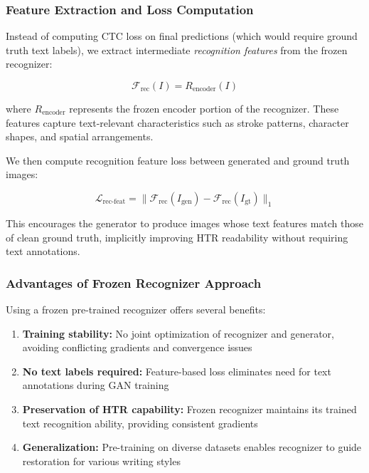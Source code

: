 \documentclass[journal]{IEEEtran}
\begin{document}
\subsubsection{Feature Extraction and Loss Computation}

Instead of computing CTC loss on final predictions (which would require ground truth text labels), we extract intermediate \textit{recognition features} from the frozen recognizer:

\begin{equation}
\mathcal{F}_{\text{rec}}(I) = R_{\text{encoder}}(I)
\end{equation}

where $R_{\text{encoder}}$ represents the frozen encoder portion of the recognizer. These features capture text-relevant characteristics such as stroke patterns, character shapes, and spatial arrangements.

We then compute recognition feature loss between generated and ground truth images:

\begin{equation}
\mathcal{L}_{\text{rec-feat}} = \|\mathcal{F}_{\text{rec}}(I_{\text{gen}}) - \mathcal{F}_{\text{rec}}(I_{\text{gt}})\|_1
\end{equation}

This encourages the generator to produce images whose text features match those of clean ground truth, implicitly improving HTR readability without requiring text annotations.

\subsubsection{Advantages of Frozen Recognizer Approach}

Using a frozen pre-trained recognizer offers several benefits:

\begin{enumerate}
    \item \textbf{Training stability:} No joint optimization of recognizer and generator, avoiding conflicting gradients and convergence issues
    \item \textbf{No text labels required:} Feature-based loss eliminates need for text annotations during GAN training
    \item \textbf{Preservation of HTR capability:} Frozen recognizer maintains its trained text recognition ability, providing consistent gradients
    \item \textbf{Generalization:} Pre-training on diverse datasets enables recognizer to guide restoration for various writing styles
\end{enumerate}
\end{document}
